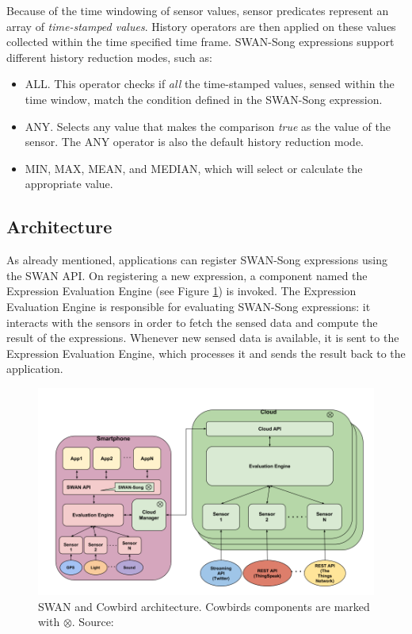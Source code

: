 Because of the time windowing of sensor values, sensor predicates represent an array of \emph{time-stamped values}. History operators are then applied on these values collected within the time specified time frame. SWAN-Song expressions support different history reduction modes, such as:
\begin{itemize}
\item ALL. This operator checks if \emph{all} the time-stamped values, sensed within the time window, match the condition defined in the SWAN-Song expression.
\item ANY. Selects any value that makes the comparison \emph{true} as the value of the sensor. The ANY operator is also the default history reduction mode.
\item MIN, MAX, MEAN, and MEDIAN, which will select or calculate the appropriate value.
\end{itemize}

\subsection{Architecture}
As already mentioned, applications can register SWAN-Song expressions using the SWAN API. On registering a new expression, a component named the Expression Evaluation Engine (see Figure \ref{fig:cowbird_architecture}) is invoked. The Expression Evaluation Engine is responsible for evaluating SWAN-Song expressions: it interacts with the sensors in order to fetch the sensed data and compute the result of the expressions. Whenever new sensed data is available, it is sent to the Expression Evaluation Engine, which processes it and sends the result back to the application.

 \begin{figure}[ht!]
\includegraphics[width=1\textwidth]{images/cowbird_architecture.png}
 \caption{SWAN and Cowbird architecture. Cowbirds components are marked with $\otimes$. Source: \cite{cowbirdarticle}}
\label{fig:cowbird_architecture}
\end{figure}

